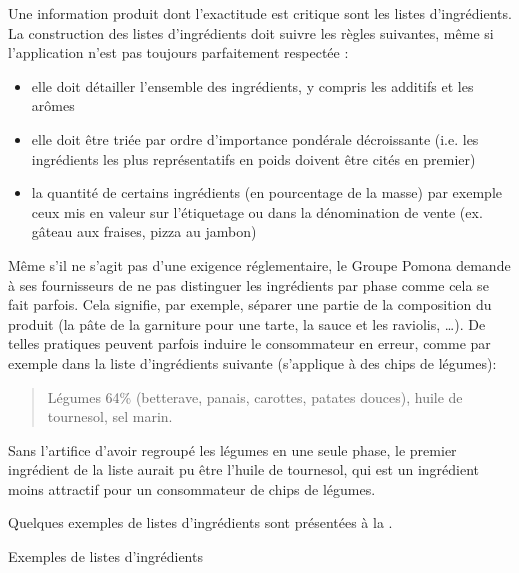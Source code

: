         Une information produit dont l'exactitude est critique sont les listes d'ingrédients.
        La construction des listes d'ingrédients doit suivre les règles suivantes, même si l'application n'est pas toujours parfaitement respectée :
        \begin{itemize}
            \item elle doit détailler l'ensemble des ingrédients, y compris les additifs et les arômes
            \item elle doit être triée par ordre d'importance pondérale décroissante (i.e. les ingrédients les plus représentatifs en poids doivent être cités en premier)
            \item la quantité de certains ingrédients (en pourcentage de la masse) par exemple ceux mis en valeur sur l'étiquetage ou dans la dénomination de vente (ex. gâteau aux fraises, pizza au jambon)
        \end{itemize}
        Même s'il ne s'agit pas d'une exigence réglementaire, le Groupe Pomona demande à ses fournisseurs de ne pas distinguer les ingrédients par phase comme cela se fait parfois.
        Cela signifie, par exemple, séparer une partie de la composition du produit (la pâte de la garniture pour une tarte, la sauce et les raviolis, \dots).
        De telles pratiques peuvent parfois induire le consommateur en erreur, comme par exemple dans la liste d'ingrédients suivante (s'applique à des chips de légumes):
        \begin{quotation}
            Légumes 64\% (betterave, panais, carottes, patates douces), huile de tournesol, sel marin.
        \end{quotation}
        Sans l'artifice d'avoir regroupé les légumes en une seule phase, le premier ingrédient de la liste aurait pu être l'huile de tournesol, qui est un ingrédient moins attractif pour un consommateur de chips de légumes.

        Quelques exemples de listes d'ingrédients sont présentées à la .

        {\renewcommand{\arraystretch}{2}%
        \begin{table}[htbp]
            {\scriptsize
            \begin{center}%
            \caption{Exemples de listes d'ingrédients}%
            \label{tbl:exemple_ingred}%
            \end{center}%
            }
        \end{table}
        }


